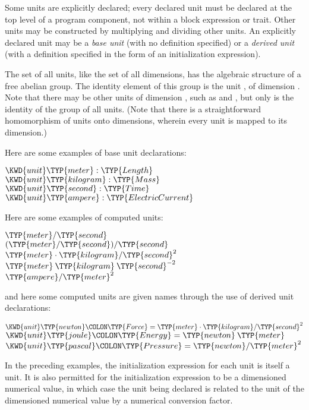 Some units are explicitly declared;
every declared unit must be declared at the top level of
a program component, not
within a block expression or trait.
Other units may be constructed by multiplying and dividing other units.
An explicitly declared unit may be a \emph{base unit} (with no definition specified)
or a \emph{derived unit} (with a definition specified in the form of an initialization expression).

The set of all units, like the set of all dimensions, has the algebraic structure of a free abelian group.
The identity element of this group is the unit , of
dimension .
Note that there may be other units of dimension , such as
 and , but only  is the
identity of the group of all units.
(Note that there is a straightforward homomorphism of units onto
dimensions, wherein every unit is mapped to its dimension.)

Here are some examples of base unit declarations:
\begin{Fortress}
\(\KWD{unit} \TYP{meter} \mathrel{\mathtt{:}} \TYP{Length}\)\\
\(\KWD{unit} \TYP{kilogram} \mathrel{\mathtt{:}} \TYP{Mass}\)\\
\(\KWD{unit} \TYP{second} \mathrel{\mathtt{:}} \TYP{Time}\)\\
\(\KWD{unit} \TYP{ampere} \mathrel{\mathtt{:}} \TYP{ElectricCurrent}\)
\end{Fortress}
Here are some examples of computed units:
\begin{Fortress}
\(\TYP{meter} / \TYP{second}\)\\
\((\TYP{meter} / \TYP{second}) / \TYP{second}\)\\
\(\TYP{meter} \cdot \TYP{kilogram} / \TYP{second}^{2}\)\\
\(\TYP{meter}\mskip 4mu plus 4mu\TYP{kilogram}\mskip 4mu plus 4mu\TYP{second}^{-2}\)\\
\(\TYP{ampere} / \TYP{meter}^{2}\)
\end{Fortress}
and here some computed units are given names through the use of
derived unit declarations:
\begin{Fortress}
\(\KWD{unit} \TYP{newton}\COLON \TYP{Force} = \TYP{meter} \cdot \TYP{kilogram} / \TYP{second}^{2}\)\\
\(\KWD{unit} \TYP{joule}\COLON \TYP{Energy} = \TYP{newton}\mskip 4mu plus 4mu\TYP{meter}\)\\
\(\KWD{unit} \TYP{pascal}\COLON \TYP{Pressure} = \TYP{newton} / \TYP{meter}^{2}\)
\end{Fortress}
In the preceding examples, the initialization expression for each unit
is itself a unit.  It is also permitted for the initialization
expression to be a dimensioned numerical value, in which case
the unit being declared is related to the unit of the dimensioned
numerical value by a numerical conversion factor.

